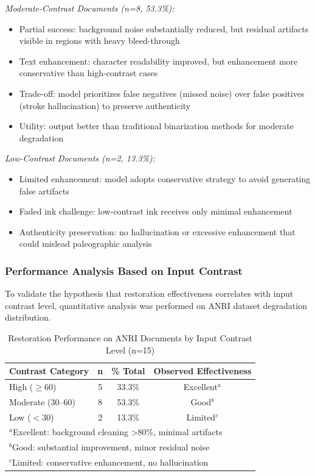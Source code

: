 \documentclass[journal]{IEEEtran}
\begin{document}
\textit{Moderate-Contrast Documents (n=8, 53.3\%):}
\begin{itemize}
    \item Partial success: background noise substantially reduced, but residual artifacts visible in regions with heavy bleed-through
    \item Text enhancement: character readability improved, but enhancement more conservative than high-contrast cases
    \item Trade-off: model prioritizes false negatives (missed noise) over false positives (stroke hallucination) to preserve authenticity
    \item Utility: output better than traditional binarization methods for moderate degradation
\end{itemize}

\textit{Low-Contrast Documents (n=2, 13.3\%):}
\begin{itemize}
    \item Limited enhancement: model adopts conservative strategy to avoid generating false artifacts
    \item Faded ink challenge: low-contrast ink receives only minimal enhancement
    \item Authenticity preservation: no hallucination or excessive enhancement that could mislead paleographic analysis
\end{itemize}

\subsubsection{Performance Analysis Based on Input Contrast}

To validate the hypothesis that restoration effectiveness correlates with input contrast level, quantitative analysis was performed on ANRI dataset degradation distribution.

\begin{table}[!t]
\renewcommand{\arraystretch}{1.3}
\caption{Restoration Performance on ANRI Documents by Input Contrast Level (n=15)}
\label{table:anri_contrast_analysis}
\centering
\small
\begin{tabular}{|l|c|c|c|}
\hline
\textbf{Contrast Category} & \textbf{n} & \textbf{\% Total} & \textbf{Observed Effectiveness} \\
\hline
High ($\geq$60) & 5 & 33.3\% & Excellent$^a$ \\
Moderate (30--60) & 8 & 53.3\% & Good$^b$ \\
Low ($<$30) & 2 & 13.3\% & Limited$^c$ \\
\hline
\multicolumn{4}{l}{\footnotesize $^a$Excellent: background cleaning >80\%, minimal artifacts} \\
\multicolumn{4}{l}{\footnotesize $^b$Good: substantial improvement, minor residual noise} \\
\multicolumn{4}{l}{\footnotesize $^c$Limited: conservative enhancement, no hallucination} \\
\end{tabular}
\end{table}
\end{document}
